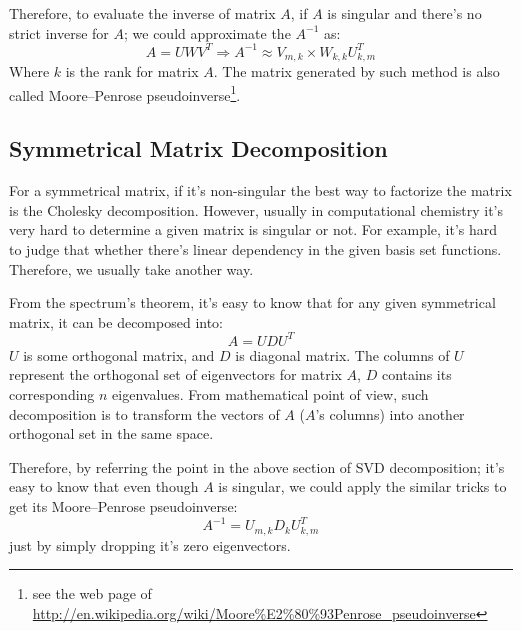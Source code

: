 Therefore, to evaluate the inverse of matrix $A$, if $A$ is singular and there's no
strict inverse for $A$; we could approximate the $A^{-1}$ as:
\begin{equation}
 \label{Solution_Linear_Equations_eq:10}
 A = UWV^{T} \Rightarrow A^{-1} \approx V_{m,k}\times W_{k,k}U^{T}_{k,m}
\end{equation}
Where $k$ is the rank for matrix $A$. The matrix generated by such method is also 
called Moore–Penrose pseudoinverse\footnote{see the web page of 
\url{http://en.wikipedia.org/wiki/Moore\%E2\%80\%93Penrose_pseudoinverse}}.

\subsection{Symmetrical Matrix Decomposition}
%
%
%
For a symmetrical matrix, if it's non-singular the best way to factorize the matrix
is the Cholesky decomposition. However, usually in computational chemistry it's very hard
to determine a given matrix is singular or not. For example, it's hard to judge that 
whether there's linear dependency in the given basis set functions. Therefore, we usually
take another way.

From the spectrum's theorem, it's easy to know that for any given symmetrical matrix,
it can be decomposed into:
\begin{equation}
  \label{Solution_Linear_Equations_eq:11}
  A = UDU^{T}
\end{equation}
$U$ is some orthogonal matrix, and $D$ is diagonal matrix. The columns of $U$ represent
the orthogonal set of eigenvectors for matrix $A$, $D$ contains its corresponding $n$
eigenvalues. From mathematical point of view, such decomposition is to transform the 
vectors of $A$ ($A$'s columns) into another orthogonal set in the same space.

Therefore, by referring the point in the above section of SVD decomposition; it's easy 
to know that even though $A$ is singular, we could apply the similar tricks to get its
Moore–Penrose pseudoinverse:
\begin{equation}
  \label{Solution_Linear_Equations_eq:11}
  A^{-1} = U_{m,k}D_{k}U^{T}_{k,m}
\end{equation}
just by simply dropping it's zero eigenvectors.